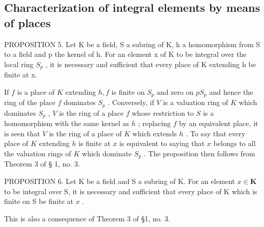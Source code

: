 \subsection{Characterization of integral elements by means of places}

PROPOSITION 5. Let K be a field, S a subring of K, h a homomorphism from S to a field and p the kernel of h. For an element x of K to be integral over the local ring \(S_{p}\) , it is necessary and sufficient that every place of K extending h be finite at x.

If \(f\) is a place of \(K\) extending \(h, f\) is finite on \(S_p\) and zero on \(pS_p\) and hence the ring of the place \(f\) dominates \(S_p\) . Conversely, if \(V\) is a valuation ring of \(K\) which dominates \(S_p\) , \(V\) is the ring of a place \(f\) whose restriction to \(S\) is a homomorphism with the same kernel as \(h\) ; replacing \(f\) by an equivalent place, it is seen that \(V\) is the ring of a place of \(K\) which extends \(h\) . To say that every place of \(K\) extending \(h\) is finite at \(x\) is equivalent to saying that \(x\) belongs to all the valuation rings of \(K\) which dominate \(S_p\) . The proposition then follows from Theorem 3 of § 1, no. 3.

PROPOSITION 6. Let K be a field and S a subring of K. For an element \(x \in \mathbf{K}\) to be integral over S, it is necessary and sufficient that every place of K which is finite on S be finite at \(x\) .

This is also a consequence of Theorem 3 of §1, no. 3.

